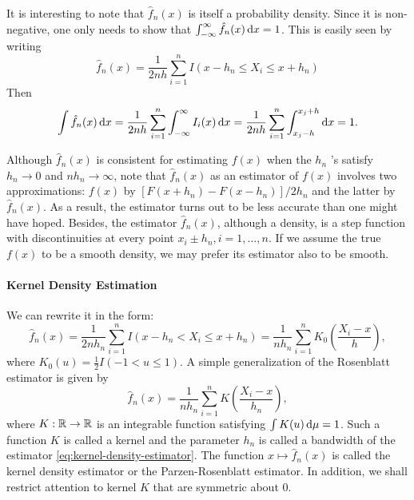 It is interesting to note that $\hat{f}_{n}(x)$ is itself a probability density. Since it is non-negative, one only needs to show that $\int_{-\infty}^{\infty}\hat{f}_{n}(x)\mathop{}\!\mathrm{d} x=1$. This is easily seen by writing
\begin{equation*}
	\hat{f}_{n}(x)=\frac{1}{2nh}\sum_{i=1}^{n}I(x-h_{n}\leq X_{i}\leq x+h_{n})
\end{equation*}
Then
\begin{equation*}
	\int\hat{f}_{n}(x)\mathop{}\!\mathrm{d} x=\frac{1}{2nh}\sum_{i=1}^{n}\int_{-\infty}^{\infty}I_i(x)\mathop{}\!\mathrm{d} x=\frac{1}{2nh}\sum_{i=1}^{n}\int_{x_j-h}^{x_j+h}\mathop{}\!\mathrm{d} x=1 .
\end{equation*}

\begin{remark}
	Although $\hat{f}_{n}(x)$ is consistent for estimating $f(x)$ when the $h_{n}$ 's satisfy $h_{n}\rightarrow0$ and $nh_{n}\rightarrow\infty$, note that $\hat{f}_{n}(x)$ as an estimator of $f(x)$ involves two approximations: $f(x)$ by $[F(x+h_{n})-F(x-h_{n})]/2h_{n}$ and the latter by $\hat{f}_{n}(x)$. As a result, the estimator turns out to be less accurate than one might have hoped.
	Besides, the estimator $\hat{f}_{n}(x)$, although a density, is a step function with discontinuities at every point $x_{i}\pm h_{n},i=1,\ldots,n$. If we assume the true $f(x)$ to be a smooth density, we may prefer its estimator also to be smooth.
\end{remark}

\paragraph{Kernel Density Estimation}

We can rewrite it in the form:
\begin{equation*}
	\hat{f}_{n}(x)=\frac{1}{2nh_{n}}\sum_{i=1}^{n}I\left(x-h_{n}<X_{i}\leq x+h_{n}\right)=\frac{1}{nh_{n}}\sum_{i=1}^{n}K_{0}\left(\frac{X_i-x}{h}\right),
\end{equation*}
where $K_0(u)=\frac{1}{2}I(-1<u\leq 1)$. A simple generalization of the Rosenblatt estimator is given by
\begin{equation}
	\label{eq:kernel-density-estimator}
	\hat{f}_{n}(x)=\frac{1}{nh_{n}}\sum_{i=1}^{n}K\left(\frac{X_{i}-x}{h_{n}}\right),
\end{equation}
where $K:{\mathbb R}\rightarrow{\mathbb R}$ is an integrable function satisfying $\int K(u)\mathop{}\!\mathrm{d}\mu=1$.
Such a function $K$ is called a kernel and the parameter $h_{n}$ is called a bandwidth of the estimator \eqref{eq:kernel-density-estimator}.
The function $x\mapsto\hat{f}_{n}(x)$ is called the kernel density estimator or the Parzen-Rosenblatt estimator.
In addition, we shall restrict attention to kernel $K$ that are symmetric about $0$.

